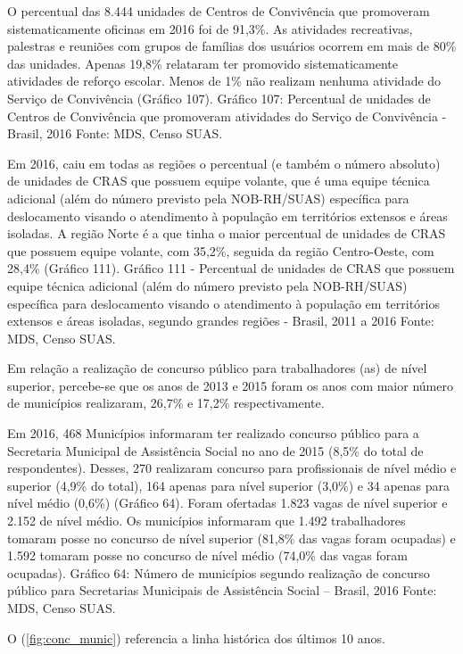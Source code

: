 \documentclass[
  brazilian]{report}
\begin{document}
O percentual das 8.444 unidades de Centros de Convivência que promoveram
sistematicamente oficinas em 2016 foi de 91,3\%. As atividades
recreativas, palestras e reuniões com grupos de famílias dos usuários
ocorrem em mais de 80\% das unidades. Apenas 19,8\% relataram ter
promovido sistematicamente atividades de reforço escolar. Menos de 1\%
não realizam nenhuma atividade do Serviço de Convivência (Gráfico 107).
Gráfico 107: Percentual de unidades de Centros de Convivência que
promoveram atividades do Serviço de Convivência - Brasil, 2016 Fonte:
MDS, Censo SUAS.

Em 2016, caiu em todas as regiões o percentual (e também o número
absoluto) de unidades de CRAS que possuem equipe volante, que é uma
equipe técnica adicional (além do número previsto pela NOB-RH/SUAS)
específica para deslocamento visando o atendimento à população em
territórios extensos e áreas isoladas. A região Norte é a que tinha o
maior percentual de unidades de CRAS que possuem equipe volante, com
35,2\%, seguida da região Centro-Oeste, com 28,4\% (Gráfico 111).
Gráfico 111 - Percentual de unidades de CRAS que possuem equipe técnica
adicional (além do número previsto pela NOB-RH/SUAS) específica para
deslocamento visando o atendimento à população em territórios extensos e
áreas isoladas, segundo grandes regiões - Brasil, 2011 a 2016 Fonte:
MDS, Censo SUAS.

Em relação a realização de concurso público para trabalhadores (as) de
nível superior, percebe-se que os anos de 2013 e 2015 foram os anos com
maior número de municípios realizaram, 26,7\% e 17,2\% respectivamente.

Em 2016, 468 Municípios informaram ter realizado concurso público para a
Secretaria Municipal de Assistência Social no ano de 2015 (8,5\% do
total de respondentes). Desses, 270 realizaram concurso para
profissionais de nível médio e superior (4,9\% do total), 164 apenas
para nível superior (3,0\%) e 34 apenas para nível médio (0,6\%)
(Gráfico 64). Foram ofertadas 1.823 vagas de nível superior e 2.152 de
nível médio. Os municípios informaram que 1.492 trabalhadores tomaram
posse no concurso de nível superior (81,8\% das vagas foram ocupadas) e
1.592 tomaram posse no concurso de nível médio (74,0\% das vagas foram
ocupadas). Gráfico 64: Número de municípios segundo realização de
concurso público para Secretarias Municipais de Assistência Social --
Brasil, 2016 Fonte: MDS, Censo SUAS.

O (\cref{fig:conc_munic}) referencia a linha histórica dos últimos 10
anos.
\end{document}
